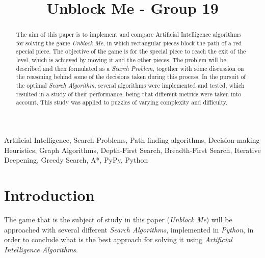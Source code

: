 \documentclass[conference]{IEEEtran}
\begin{document}
\title{Unblock Me - Group 19}

\author{
\and
{}
\and
{}
}

\maketitle

\begin{abstract}
The aim of this paper is to implement and compare Artificial Intelligence algorithms for solving the game \textit{Unblock Me}, in which rectangular pieces block the path of a red special piece. The objective of the game is for the special piece to reach the exit of the level, which is achieved by moving it and the other pieces.
The problem will be described and then formulated as a \textit{Search Problem}, together with some discussion on the reasoning behind some of the decisions taken during this process. In the pursuit of the optimal \textit{Search Algorithm}, several algorithms were implemented and tested, which resulted in a study of their performance, being that different metrics were taken into account. This study was applied to puzzles of varying complexity and difficulty.
\end{abstract}

\begin{IEEEkeywords}
Artificial Intelligence, Search Problems, Path-finding algorithms, Decision-making Heuristics, Graph Algorithms, Depth-First Search, Breadth-First Search, Iterative Deepening, Greedy Search, A*, PyPy, Python
\end{IEEEkeywords}

\section{Introduction}
The game that is the subject of study in this paper (\textit{Unblock Me}) will be approached with several different \textit{Search Algorithms}, implemented in \textit{Python}, in order to conclude what is the best approach for solving it using \textit{Artificial Intelligence Algorithms}.
\end{document}
